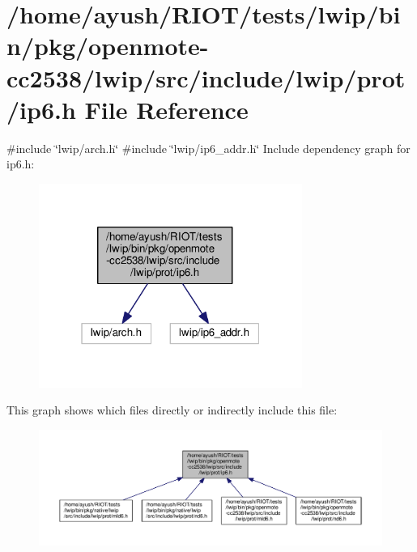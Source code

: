 \hypertarget{openmote-cc2538_2lwip_2src_2include_2lwip_2prot_2ip6_8h}{}\section{/home/ayush/\+R\+I\+O\+T/tests/lwip/bin/pkg/openmote-\/cc2538/lwip/src/include/lwip/prot/ip6.h File Reference}
\label{openmote-cc2538_2lwip_2src_2include_2lwip_2prot_2ip6_8h}
{\ttfamily \#include \char`\"{}lwip/arch.\+h\char`\"{}}\newline
{\ttfamily \#include \char`\"{}lwip/ip6\+\_\+addr.\+h\char`\"{}}\newline
Include dependency graph for ip6.\+h\+:
\nopagebreak
\begin{figure}[H]
\begin{center}
\leavevmode
\includegraphics[width=244pt]{openmote-cc2538_2lwip_2src_2include_2lwip_2prot_2ip6_8h__incl}
\end{center}
\end{figure}
This graph shows which files directly or indirectly include this file\+:
\nopagebreak
\begin{figure}[H]
\begin{center}
\leavevmode
\includegraphics[width=350pt]{openmote-cc2538_2lwip_2src_2include_2lwip_2prot_2ip6_8h__dep__incl}
\end{center}
\end{figure}
